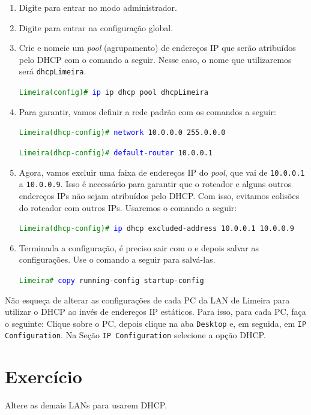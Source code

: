 \begin{enumerate}[label*=\arabic*.]
   \item Digite  para entrar no modo administrador.
   \item Digite  para entrar na configuração global.
   \item Crie e nomeie um \textit{pool} (agrupamento) de endereços IP que serão atribuídos pelo DHCP com o comando a seguir. Nesse caso, o nome que utilizaremos será \texttt{dhcpLimeira}.

    \texttt{\textcolor{green}{Limeira(config)\#} \textcolor{blue}{ip} ip dhcp pool dhcpLimeira}

   \item Para garantir, vamos definir a rede padrão com os comandos a seguir: 
   
     \texttt{\textcolor{green}{Limeira(dhcp-config)\#} \textcolor{blue}{network} 10.0.0.0 255.0.0.0}
     
     \texttt{\textcolor{green}{Limeira(dhcp-config)\#} \textcolor{blue}{default-router} 10.0.0.1}

    \item Agora, vamos excluir uma faixa de endereços IP do \textit{pool}, que vai de \texttt{10.0.0.1} a \texttt{10.0.0.9}. Isso é necessário para garantir que o roteador e alguns outros endereços IPs não sejam atribuídos pelo DHCP. Com isso, evitamos colisões do roteador com outros IPs. Usaremos o comando a seguir:
     
     \texttt{\textcolor{green}{Limeira(dhcp-config)\#} \textcolor{blue}{ip} dhcp excluded-address 10.0.0.1 10.0.0.9}

     \item Terminada a configuração, é preciso sair com o  e depois salvar as configurações. Use o comando a seguir para salvá-las.

       \texttt{\textcolor{green}{Limeira\#} \textcolor{blue}{copy} running-config startup-config}
\end{enumerate}

Não esqueça de alterar as configurações de cada PC da LAN de Limeira para utilizar o DHCP ao invés de endereços IP estáticos. Para isso, para cada PC, faça o seguinte: Clique sobre o PC, depois clique na aba \texttt{Desktop} e, em seguida, em \texttt{IP Configuration}. Na Seção \texttt{IP Configuration} selecione a opção DHCP.

\section{Exercício}
Altere as demais LANs para usarem DHCP.